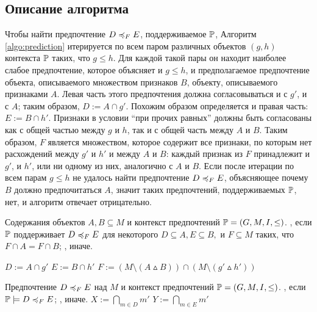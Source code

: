 	\subsection{Описание алгоритма}
		Чтобы найти предпочтение $D \preccurlyeq_{F} E$, поддерживаемое $\mathbb{P}$, Алгоритм \ref{algo:prediction} итерируется по всем паром различных объектов $(g, h)$ контекста $\mathbb{P}$ таких, что $g \leq h$. Для каждой такой пары он находит наиболее слабое предпочтение, которое объясняет и $g \leq h$, и предполагаемое предпочтение объекта, описываемого множеством признаков $B$, объекту, описываемого признаками $A$. Левая часть этого предпочтения должна согласовываться и с $g'$, и с $A$; таким образом, $D := A \cap g'$. Похожим образом определяется и правая часть: $E := B \cap h'$. Признаки в условии \enquote{при прочих равных} должны быть согласованы как с общей частью между $g$ и $h$, так и с общей часть между $A$ и $B$. Таким образом, $F$ является множеством, которое содержит все признаки, по которым нет расхождений между $g'$ и $h'$ и между $A$ и $B$: каждый признак из $F$ принадлежит и $g'$, и $h'$, или ни одному из них, аналогично с $A$ и $B$. %
		Если после итерации по всем парам $g \leq h$ не удалось найти предпочтение $D \preccurlyeq_{F} E$, объясняющее почему $B$ должно предпочитаться $A$, значит таких предпочтений, поддерживаемых $\mathbb{P}$, нет, и алгоритм отвечает отрицательно.
	
		\begin{algorithm}
			\caption{$(A, B, \PP)$ \cite[Алг.~1]{Obiedkov:2013}}
			\label{algo:prediction}
			\begin{algorithmic}[1]
				\REQUIRE Содержания объектов $A, B \subseteq M$ и контекст предпочтений $\mathbb{P} = (G, M, I, \leq)$.
				\ENSURE \TRUE, если $\mathbb{P}$ поддерживает $D \preccurlyeq_{F} E$ для некоторого $D \subseteq A, E \subseteq B,$ и $F \subseteq M$ таких, что $F \cap A = F \cap B$; \FALSE, иначе.
				\item[]
				\STATE $D := A \cap g'$
				\STATE $E := B \cap h'$
				\STATE $F := (M \setminus (A \vartriangle B)) \cap (M \setminus (g' \vartriangle h'))$
				\IF{$\PP \models \DEF$}
				\RETURN \TRUE
				\ENDIF
				\ENDFOR
				\ENDFOR
				\RETURN \FALSE
			\end{algorithmic}
		\end{algorithm}
		\begin{algorithm}
			\caption{$(\DEF, \PP)$ \cite[Алг.~2]{Obiedkov:2013}}
			\label{algo:check}
			\begin{algorithmic}
				\REQUIRE Предпочтение $D \preccurlyeq_{F} E$ над $M$ и контекст предпочтений $\mathbb{P} = (G, M, I, \leq)$.%
				\ENSURE \TRUE, если $\PP \models \DEF$; \FALSE, иначе.
				\STATE
				\STATE $X := \bigcap_{m \in D}m'$
				\STATE $Y := \bigcap_{m \in E}m'$
				\FORALL{$g \in X$}
				\FORALL{$h \in Y$}
				\IF {$g \not\leq h$ and $g' \cap {F} = h' \cap {F}$}
				\RETURN \FALSE
				\ENDIF
				\ENDFOR
				\ENDFOR
				\RETURN \TRUE
			\end{algorithmic}
		\end{algorithm}
		